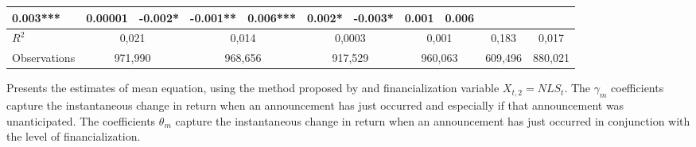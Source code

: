 \begin{landscape}
\begin{table}[]
{\begin{tabular}{lllllllllllll}
  0.003*** &
  0.00001 &
  -0.002* &
  -0.001** &
  0.006*** &
  0.002* &
  -0.003* &
  0.001 &
  0.006 \\ \hline
$R^2$ &
  \multicolumn{2}{c}{0,021} &
  \multicolumn{2}{c}{0,014} &
  \multicolumn{2}{c}{0,0003} &
  \multicolumn{2}{c}{0,001} &
  \multicolumn{2}{c}{0,183} &
  \multicolumn{2}{c}{0,017} \\
Observations &
  \multicolumn{2}{c}{971,990} &
  \multicolumn{2}{c}{968,656} &
  \multicolumn{2}{c}{917,529} &
  \multicolumn{2}{c}{960,063} &
  \multicolumn{2}{c}{609,496} &
  \multicolumn{2}{c}{880,021} \\ \hline
\end{tabular}%
}
\singlespacing
        \footnotesize
 Presents the estimates of mean equation, using the method proposed by \citep{andersen2007real} and financialization variable $X_{t,2}=NLS_t$. The $\gamma_m$ coefficients capture the instantaneous change in return when an announcement has just occurred and especially if that announcement was unanticipated. The coefficients $\theta_m$ capture the instantaneous change in return when an announcement has just occurred in conjunction with the level of financialization.
\end{table}
\end{landscape}

